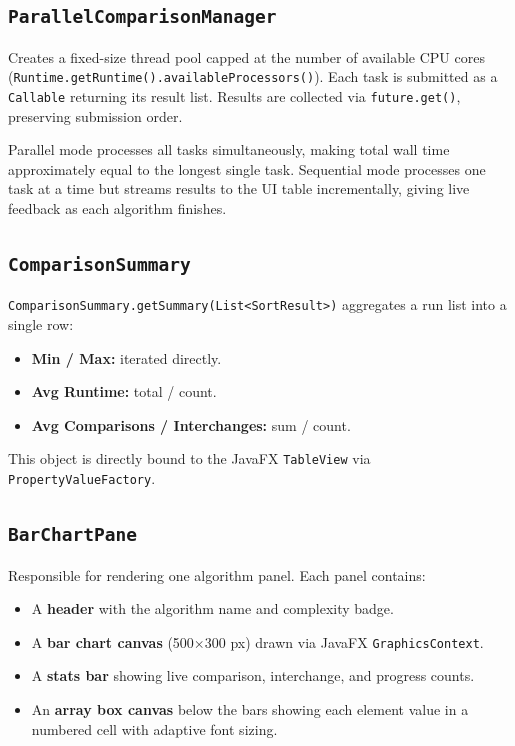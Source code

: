 \documentclass[12pt,a4paper]{article}
\begin{document}
\subsection{\texttt{ParallelComparisonManager}}

Creates a fixed-size thread pool capped at the number of available CPU cores
(\texttt{Runtime.getRuntime().availableProcessors()}). Each task is submitted
as a \texttt{Callable} returning its result list. Results are collected via
\texttt{future.get()}, preserving submission order.

\begin{designbox}[title=Parallel vs Sequential]
    Parallel mode processes all tasks simultaneously, making total wall time
    approximately equal to the longest single task. Sequential mode processes
    one task at a time but streams results to the UI table incrementally,
    giving live feedback as each algorithm finishes.
\end{designbox}

\subsection{\texttt{ComparisonSummary}}

\texttt{ComparisonSummary.getSummary(List<SortResult>)} aggregates a run list
into a single row:
\begin{itemize}[nosep]
    \item \textbf{Min / Max:} iterated directly.
    \item \textbf{Avg Runtime:} total / count.
    \item \textbf{Avg Comparisons / Interchanges:} sum / count.
\end{itemize}
This object is directly bound to the JavaFX \texttt{TableView} via
\texttt{PropertyValueFactory}.

\subsection{\texttt{BarChartPane}}

Responsible for rendering one algorithm panel. Each panel contains:
\begin{itemize}[nosep]
    \item A \textbf{header} with the algorithm name and complexity badge.
    \item A \textbf{bar chart canvas} (500$\times$300 px) drawn via JavaFX
          \texttt{GraphicsContext}.
    \item A \textbf{stats bar} showing live comparison, interchange, and
          progress counts.
    \item An \textbf{array box canvas} below the bars showing each element
          value in a numbered cell with adaptive font sizing.
\end{itemize}
\end{document}
